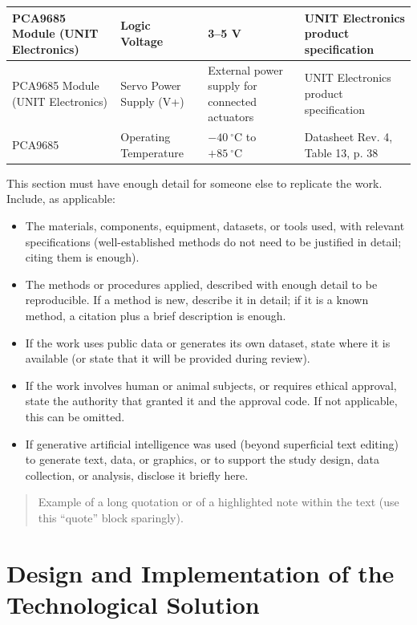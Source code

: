 \documentclass[lettersize,journal]{IEEEtran}
\begin{document}
\begin{table}[ht]
\begin{tabular}{|p{1.4cm}|p{1.8cm}|p{1.8cm}|p{1.8cm}|}
		PCA9685 Module (UNIT Electronics) &
		Logic Voltage &
		3--5 V &
		UNIT Electronics product specification \\
		\hline
		
		PCA9685 Module (UNIT Electronics) &
		Servo Power Supply (V+) &
		External power supply for connected actuators &
		UNIT Electronics product specification \\
		\hline
		
		PCA9685 &
		Operating Temperature &
		$-40~^\circ\mathrm{C}$ to $+85~^\circ\mathrm{C}$ &
		Datasheet Rev. 4, Table 13, p. 38 \\
		\hline
		
	\end{tabular}
\end{table}

This section must have enough detail for someone else to replicate
the work. Include, as applicable:
\begin{itemize}
\item The materials, components, equipment, datasets, or tools used,
with relevant specifications (well-established methods do not need to
be justified in detail; citing them is enough).
\item The methods or procedures applied, described with enough detail
to be reproducible. If a method is new, describe it in detail; if it
is a known method, a citation plus a brief description is enough.
\item If the work uses public data or generates its own dataset,
state where it is available (or state that it will be provided during
review).
\item If the work involves human or animal subjects, or requires
ethical approval, state the authority that granted it and the
approval code. If not applicable, this can be omitted.
\item If generative artificial intelligence was used (beyond
superficial text editing) to generate text, data, or graphics, or to
support the study design, data collection, or analysis, disclose it
briefly here.
\end{itemize}

\begin{quote}
Example of a long quotation or of a highlighted note within the
text (use this ``quote'' block sparingly).
\end{quote}

\section{Design and Implementation of the Technological Solution}
\label{sec:design}
\end{document}
